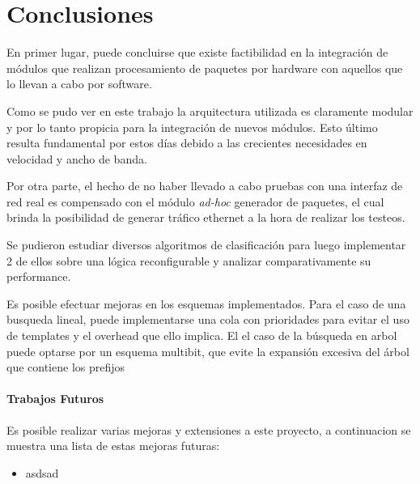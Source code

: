 \chapter{Conclusiones}

En primer lugar, puede concluirse que existe factibilidad en la integración de módulos que realizan procesamiento de paquetes por hardware con aquellos que lo llevan a cabo por software.

Como se pudo ver en este trabajo la arquitectura utilizada es claramente modular y por lo tanto propicia para la integración de nuevos módulos. Esto último resulta fundamental por estos días debido a las crecientes necesidades en velocidad y ancho de banda.

Por otra parte, el hecho de no haber llevado a cabo pruebas con una interfaz de red real es compensado con el módulo \textit{ad-hoc} generador de paquetes, el cual brinda la posibilidad de generar tráfico ethernet a la hora de realizar los testeos.

Se pudieron estudiar diversos algoritmos de clasificación para luego implementar 2 de ellos sobre una lógica reconfigurable y analizar comparativamente su performance.

Es posible efectuar mejoras en los esquemas implementados. Para el caso de una busqueda lineal, puede implementarse una cola con prioridades para evitar el uso de templates y el overhead que ello implica. El el caso de la búsqueda en arbol puede optarse por un esquema multibit, que evite la expansión excesiva del árbol que contiene los prefijos 

\subsubsection{Trabajos Futuros}

Es posible realizar varias mejoras y extensiones a este proyecto, a continuacion se muestra una lista de estas mejoras futuras:

\begin{itemize}
	\item asdsad
\end{itemize}







